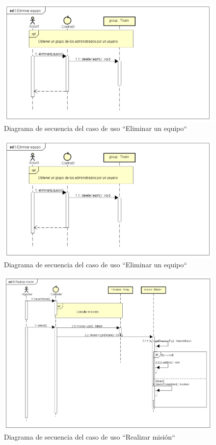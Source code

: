 \documentclass[twoside]{report}
\begin{document}
\begin{figure}[H]
\includegraphics[scale=0.5]{images/sequence/removeTeam}
\caption{Diagrama de secuencia del caso de uso “Eliminar un equipo“}
\end{figure}

\begin{figure}[H]
\includegraphics[scale=0.5]{images/sequence/removeTeam}
\caption{Diagrama de secuencia del caso de uso “Eliminar un equipo“}
\end{figure}

\begin{figure}[H]
\includegraphics[scale=0.5]{images/sequence/realizarMision}
\caption{Diagrama de secuencia del caso de uso “Realizar misión“}
\end{figure}
\end{document}
